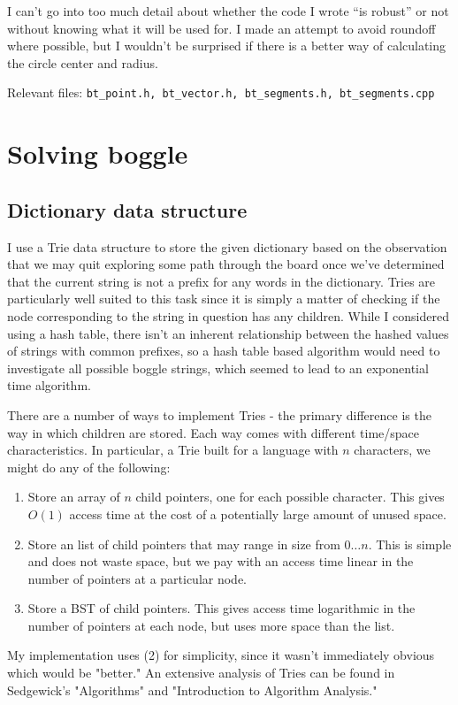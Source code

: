 \documentclass{article}
\begin{document}
I can't go into too much detail about whether the code I wrote ``is robust'' or
not without knowing what it will be used for. I made an attempt to avoid
roundoff where possible, but I wouldn't be surprised if there is a better way of
calculating the circle center and radius. 

\vspace{1em}
\noindent Relevant files: \texttt{bt\_point.h, bt\_vector.h, bt\_segments.h,
bt\_segments.cpp}

\section{Solving boggle}

\subsection{Dictionary data structure}

I use a Trie data structure to store the given dictionary based on the
observation that we may quit exploring some path through the board once we've
determined that the current string is not a prefix for any words in the
dictionary. Tries are particularly well suited to this task since it is simply
a matter of checking if the node corresponding to the string in question has
any children. While I considered using a hash table, there isn't an inherent
relationship between the hashed values of strings with common prefixes, so a
hash table based algorithm would need to investigate all possible boggle
strings, which seemed to lead to an exponential time algorithm.

There are a number of ways to implement Tries - the primary difference is the
way in which children are stored. Each way comes with different time/space
characteristics. In particular, a Trie built for a language with $n$ characters,
we might do any of the following:
\begin{enumerate}
  \item Store an array of $n$ child pointers, one for each possible character.
  This gives $O(1)$ access time at the cost of a potentially large amount of
  unused space.
  \item Store an list of child pointers that may range in size from $0\ldots n$.
  This is simple and does not waste space, but we pay with an access time linear
  in the number of pointers at a particular node.
  \item Store a BST of child pointers. This gives access time logarithmic in the
  number of pointers at each node, but uses more space than the list.
\end{enumerate}
My implementation uses (2) for simplicity, since it wasn't immediately obvious
which would be "better." An extensive analysis of Tries can be found in
Sedgewick's "Algorithms" and "Introduction to Algorithm Analysis."
\end{document}
